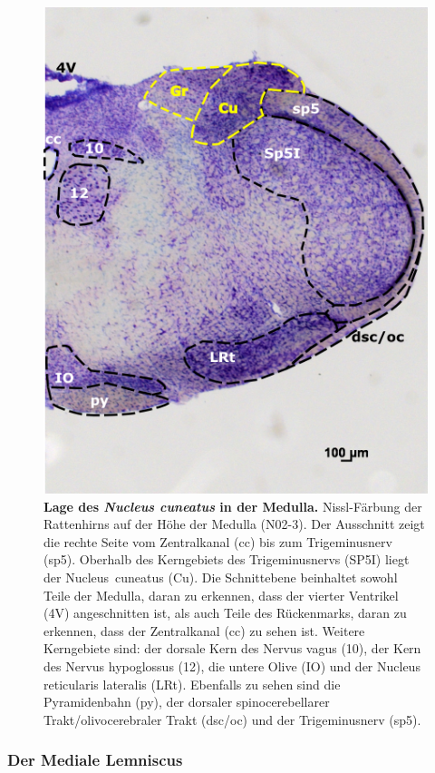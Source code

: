 \begin{figure}[H]
    \centering
    \includegraphics{pictures/somatosensory/nucleus_cuneatus.png}
    \caption[Lage des Nucleus cuneatus in der Medulla]{\textbf{Lage des \textit{Nucleus cuneatus} in der Medulla.} Nissl-Färbung der Rattenhirns auf der Höhe der Medulla (N02-3). Der Ausschnitt zeigt die rechte Seite vom Zentralkanal (cc) bis zum Trigeminusnerv (sp5). Oberhalb des Kerngebiets des Trigeminusnervs (SP5I) liegt der Nucleus~cuneatus (Cu). Die Schnittebene beinhaltet sowohl Teile der Medulla, daran zu erkennen, dass der vierter Ventrikel (4V) angeschnitten ist, als auch Teile des Rückenmarks, daran zu erkennen, dass der Zentralkanal (cc) zu sehen ist. Weitere Kerngebiete sind: der dorsale Kern des Nervus vagus (10), der Kern des Nervus hypoglossus (12), die untere Olive (IO) und der Nucleus reticularis lateralis (LRt). Ebenfalls zu sehen sind die Pyramidenbahn (py), der dorsaler spinocerebellarer Trakt/olivocerebraler Trakt (dsc/oc) und der Trigeminusnerv (sp5).}
    \label{fig:nucleus_cuneatus}
\end{figure}

\subsubsection*{Der Mediale Lemniscus}

